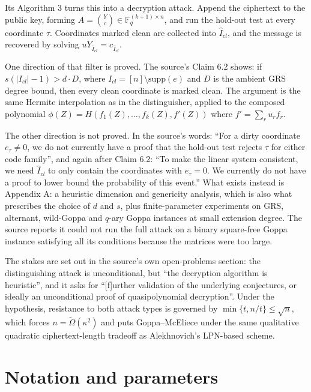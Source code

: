 \documentclass{aicr-conjecture}
\newcommand{\F}{\mathbb{F}}
\newcommand{\supp}{\mathrm{supp}}
\newcommand{\Om}{\Omega}
\begin{document}
Its Algorithm 3 turns this into a decryption attack. Append the
ciphertext to the public key, forming $A = \binom{Y}{c} \in
\F_{q}^{(k+1) \times n}$, and run the hold-out test at every coordinate
$\tau$. Coordinates marked clean are collected into $\widehat{I}_{cl}$,
and the message is recovered by solving $u Y_{\widehat{I}_{cl}} =
c_{\widehat{I}_{cl}}$.

One direction of that filter is proved. The source's Claim 6.2 shows: if
$s(|I_{cl}| - 1) > d \cdot D$, where $I_{cl} = [n] \setminus \supp(e)$
and $D$ is the ambient GRS degree bound, then every clean coordinate is
marked clean. The argument is the same Hermite interpolation as in the
distinguisher, applied to the composed polynomial $\phi(Z) =
H(f_{1}(Z), \dots, f_{k}(Z), f'(Z))$ where $f' = \sum_{r} u_{r} f_{r}$.

The other direction is not proved. In the source's words: ``For a dirty
coordinate $e_{\tau} \ne 0$, we do not currently have a proof that the
hold-out test rejects $\tau$ for either code family'', and again after
Claim 6.2: ``To make the linear system consistent, we need
$\widehat{I}_{cl}$ to only contain the coordinates with $e_{\tau} = 0$.
We currently do not have a proof to lower bound the probability of this
event.'' What exists instead is Appendix A: a heuristic dimension and
genericity analysis, which is also what prescribes the choice of $d$ and
$s$, plus finite-parameter experiments on GRS, alternant, wild-Goppa and
$q$-ary Goppa instances at small extension degree. The source reports it
could not run the full attack on a binary square-free Goppa instance
satisfying all its conditions because the matrices were too large.

The stakes are set out in the source's own open-problems section: the
distinguishing attack is unconditional, but ``the decryption algorithm is
heuristic'', and it asks for ``[f]urther validation of the underlying
conjectures, or ideally an unconditional proof of quasipolynomial
decryption''. Under the hypothesis, resistance to both attack types is
governed by $\min\{t, n/t\} \le \sqrt{n}$, which forces $n =
\widetilde{\Om}(\kappa^{2})$ and puts Goppa--McEliece under the same
qualitative quadratic ciphertext-length tradeoff as Alekhnovich's
LPN-based scheme.

\section{Notation and parameters}\label{sec:notation}
\end{document}
